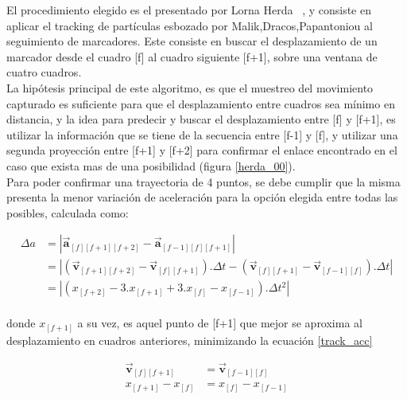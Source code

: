 El procedimiento elegido es el presentado por Lorna Herda~\cite{herda} , y consiste en aplicar el tracking de partículas esbozado por Malik,Dracos,Papantoniou \cite{griegos} al seguimiento de marcadores. Este consiste en buscar el desplazamiento de un marcador desde el cuadro [f] al cuadro siguiente [f+1], sobre una ventana de cuatro cuadros.
\\ 

La hipótesis principal de este algoritmo, es que el muestreo del movimiento capturado es suficiente para que el desplazamiento entre cuadros sea mínimo en distancia, y la idea para predecir y buscar el desplazamiento entre [f] y [f+1], es utilizar la información que se tiene de la secuencia entre [f-1] y [f], y utilizar una segunda proyección entre [f+1] y [f+2] para confirmar el enlace encontrado en el caso que exista mas de una posibilidad (figura \ref{herda_00}).
\\ 

Para poder confirmar una trayectoria de 4 puntos, se debe cumplir que la misma presenta la menor variación de aceleración para la opción elegida entre todas las posibles, calculada como:

\begin{equation}
\begin{split}
\Delta{a}&= \left| \boldsymbol{\overrightarrow{a}}_{[f][f+1][f+2]}-\boldsymbol{\overrightarrow{a}}_{[f-1][f][f+1]} \right| \\
&= \left| \left(\boldsymbol{\overrightarrow{v}}_{[f+1][f+2]}-\boldsymbol{\overrightarrow{v}}_{[f][f+1]}\right).\Delta{t}-\left(\boldsymbol{\overrightarrow{v}}_{[f][f+1]}-\boldsymbol{\overrightarrow{v}}_{[f-1][f]}\right).\Delta{t} \right| \\
&= \left|\left( x_{[f+2]} - 3.x_{[f+1]} + 3.x_{[f]} - x_{[f-1]} \right).\Delta{t}^2\right|\\
\end{split}
\label{track_var_acc}
\end{equation}

donde $x_{[f+1]}$ a su vez, es aquel punto de [f+1] que mejor se aproxima al desplazamiento en cuadros anteriores, minimizando la ecuación \ref{track_acc} 

\begin{equation}
\begin{split}
\boldsymbol{\overrightarrow{v}}_{[f][f+1]}& = \boldsymbol{\overrightarrow{v}}_{[f-1][f]} \\
x_{[f+1]}-x_{[f]}& = x_{[f]}-x_{[f-1]} \\
\end{split}
\label{track_acc}
\end{equation}

